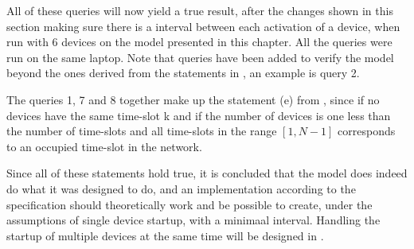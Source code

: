 All of these queries will now yield a true result, after the changes shown in this section making sure there is a interval between each activation of a device, when run with 6 devices on the model presented in this chapter.
All the queries were run on the same laptop.
Note that queries have been added to verify the model beyond the ones derived from the statements in , an example is query 2.

The queries 1, 7 and 8 together make up the statement (e) from , since if no devices have the same time-slot k and if the number of devices is one less than the number of time-slots and all time-slots in the range $[1, N-1]$ corresponds to an occupied time-slot in the network.

Since all of these statements hold true, it is concluded that the model does indeed do what it was designed to do, and an implementation according to the specification should theoretically work and be possible to create, under the assumptions of single device startup, with a minimaal interval.
Handling the startup of multiple devices at the same time will be designed in .
\newpage